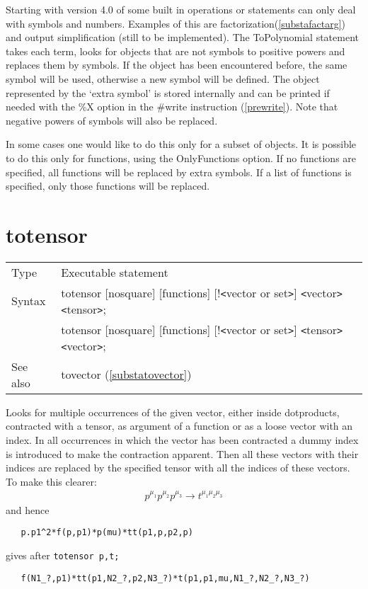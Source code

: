 \noindent Starting with version 4.0 of \FORM{} some built in operations or
statements can only deal with symbols and numbers. Examples of this are 
factorization(\ref{substafactarg}) and output simplification (still to be 
implemented). The ToPolynomial statement takes each term, looks for objects 
that are not symbols to positive powers and replaces them by symbols. If 
the object has been encountered before, the same symbol will be used, 
otherwise a new symbol will be defined. The object represented by the 
`extra symbol' is stored internally and can be printed if needed with the 
\%X option in the \#write instruction (\ref{prewrite}). Note that negative 
powers of symbols will also be replaced.

In some cases one would like to do this only for a subset of objects. It is 
possible to do this only for functions, using the OnlyFunctions option. If 
no functions are specified, all functions will be replaced by extra 
symbols. If a list of functions is specified, only those functions will be 
replaced.
\vspace{10mm}


\section{totensor}
\label{substatotensor}

\noindent \begin{tabular}{ll}
Type & Executable statement\\
Syntax & totensor [nosquare] [functions] [!{\tt<}vector or set{\tt>}] {\tt<}vector{\tt>} {\tt<}tensor{\tt>}; \\
       & totensor [nosquare] [functions] [!{\tt<}vector or set{\tt>}] {\tt<}tensor{\tt>} {\tt<}vector{\tt>};
\\ See also & tovector (\ref{substatovector})
\end{tabular} \vspace{4mm}

\noindent Looks for multiple occurrences of the given 
vector, either inside dotproducts, contracted with a tensor, as argument of 
a function or as a loose vector with an index. In all occurrences in 
which the vector has been contracted a dummy index is introduced to make 
the contraction apparent. Then all these vectors with their indices are 
replaced by the specified tensor with all the indices of these vectors. To 
make this clearer:
\begin{eqnarray}
    p^{\mu_1}p^{\mu_2}p^{\mu_3} \rightarrow t^{\mu_1\mu_2\mu_3} \nonumber
\end{eqnarray}
\setcounter{equation}{6}
and hence
\begin{verbatim}
   p.p1^2*f(p,p1)*p(mu)*tt(p1,p,p2,p)
\end{verbatim}
gives after \verb:totensor p,t;:
\begin{verbatim}
   f(N1_?,p1)*tt(p1,N2_?,p2,N3_?)*t(p1,p1,mu,N1_?,N2_?,N3_?)
\end{verbatim}\vspace{4mm}

